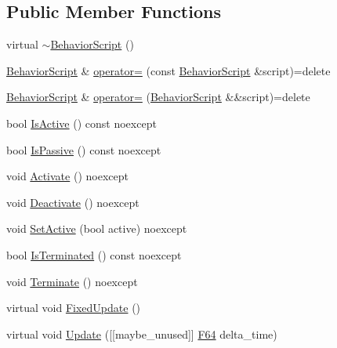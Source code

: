 \subsection*{Public Member Functions}
\begin{DoxyCompactItemize}
\item 
virtual \hyperlink{classmage_1_1_behavior_script_a61e4825ba0fc7746d49faa44ed7bc481}{$\sim$\+Behavior\+Script} ()
\item 
\hyperlink{classmage_1_1_behavior_script}{Behavior\+Script} \& \hyperlink{classmage_1_1_behavior_script_a0b3327ebf7009e668a7022d254cb1d51}{operator=} (const \hyperlink{classmage_1_1_behavior_script}{Behavior\+Script} \&script)=delete
\item 
\hyperlink{classmage_1_1_behavior_script}{Behavior\+Script} \& \hyperlink{classmage_1_1_behavior_script_a528c2bd218f2e6bb7d0a8ee50a05bf01}{operator=} (\hyperlink{classmage_1_1_behavior_script}{Behavior\+Script} \&\&script)=delete
\item 
bool \hyperlink{classmage_1_1_behavior_script_a856e1b420ea0ead36adafa750237325c}{Is\+Active} () const noexcept
\item 
bool \hyperlink{classmage_1_1_behavior_script_a40e33539ca7013a13ef127af11bff3e1}{Is\+Passive} () const noexcept
\item 
void \hyperlink{classmage_1_1_behavior_script_a84a5bf0fc7ec3ecd36dddaf001143b54}{Activate} () noexcept
\item 
void \hyperlink{classmage_1_1_behavior_script_ab45260db9c30d596b1d688a01458f63e}{Deactivate} () noexcept
\item 
void \hyperlink{classmage_1_1_behavior_script_ab0dc76b101fd514c6e9f8799de382e8a}{Set\+Active} (bool active) noexcept
\item 
bool \hyperlink{classmage_1_1_behavior_script_abb1625dbaa3b1145009ea474b082938f}{Is\+Terminated} () const noexcept
\item 
void \hyperlink{classmage_1_1_behavior_script_a2beae460bb84a135aa7e29c7baf6b25b}{Terminate} () noexcept
\item 
virtual void \hyperlink{classmage_1_1_behavior_script_a8318f79ab78798ec37b39bc844f7138c}{Fixed\+Update} ()
\item 
virtual void \hyperlink{classmage_1_1_behavior_script_afb9cf3759edf8876416d1df85489cba6}{Update} (\mbox{[}\mbox{[}maybe\+\_\+unused\mbox{]}\mbox{]} \hyperlink{namespacemage_ad26233bbec640deda836e572c1a23708}{F64} delta\+\_\+time)
\end{DoxyCompactItemize}
